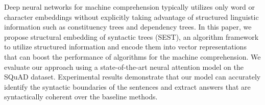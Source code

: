 Deep neural networks for machine comprehension typically utilizes only word or character embeddings without explicitly taking advantage of structured linguistic information such as constituency trees and dependency trees. In this paper, we propose structural embedding of syntactic trees (SEST), an algorithm framework to utilize structured information and encode them into vector representations that can boost the performance of algorithms for the machine comprehension. We evaluate our approach using a state-of-the-art neural attention model on the SQuAD dataset. Experimental results demonstrate that our model can accurately identify the syntactic boundaries of the sentences and extract answers that are syntactically coherent over the baseline methods.
